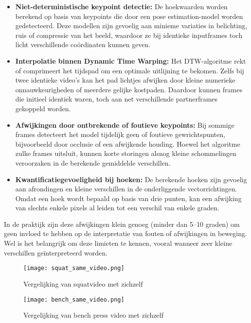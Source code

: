 \begin{itemize}
    \item \textbf{Niet-deterministische keypoint detectie:} De hoekwaarden worden berekend op basis van keypoints die door een pose estimation-model worden gedetecteerd. Deze modellen zijn gevoelig aan minieme variaties in belichting, ruis of compressie van het beeld, waardoor ze bij identieke inputframes toch licht verschillende coördinaten kunnen geven.
    
    \item \textbf{Interpolatie binnen Dynamic Time Warping:} Het DTW-algoritme rekt of comprimeert het tijdspad om een optimale uitlijning te bekomen. Zelfs bij twee identieke video’s kan het pad lichtjes afwijken door kleine numerieke onnauwkeurigheden of meerdere gelijke kostpaden. Daardoor kunnen frames die initieel identiek waren, toch aan net verschillende partnerframes gekoppeld worden.
    
    \item \textbf{Afwijkingen door ontbrekende of foutieve keypoints:} Bij sommige frames detecteert het model tijdelijk geen of foutieve gewrichtspunten, bijvoorbeeld door occlusie of een afwijkende houding. Hoewel het algoritme zulke frames uitsluit, kunnen korte storingen alsnog kleine schommelingen veroorzaken in de berekende gemiddelde verschillen.
    
    \item \textbf{Kwantificatiegevoeligheid bij hoeken:} De berekende hoeken zijn gevoelig aan afrondingen en kleine verschillen in de onderliggende vectorrichtingen. Omdat een hoek wordt bepaald op basis van drie punten, kan een afwijking van slechts enkele pixels al leiden tot een verschil van enkele graden.
\end{itemize}

In de praktijk zijn deze afwijkingen klein genoeg (minder dan 5–10 graden) om geen invloed te hebben op de interpretatie van fouten of afwijkingen in beweging. Wel is het belangrijk om deze limieten te kennen, vooral wanneer zeer kleine verschillen geïnterpreteerd worden.

\begin{figure}[H]
\centering
\texttt{[image: squat\_same\_video.png]}
\caption{Vergelijking van squatvideo met zichzelf}
\label{fig:squat_same}
\end{figure}

\begin{figure}[H]
\centering
\texttt{[image: bench\_same\_video.png]}
\caption{Vergelijking van bench press video met zichzelf}
\label{fig:bench_same}
\end{figure}

